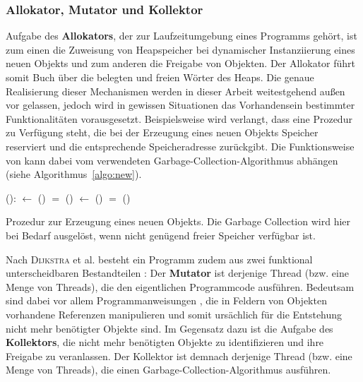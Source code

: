 \subsubsection*{Allokator, Mutator und Kollektor}
Aufgabe des \textbf{Allokators}, der zur Laufzeitumgebung eines Programms gehört, ist zum einen die Zuweisung von Heapspeicher bei dynamischer Instanziierung eines neuen Objekts und zum anderen die Freigabe von Objekten.
Der Allokator führt somit Buch über die belegten und freien Wörter des Heaps.
Die genaue Realisierung dieser Mechanismen werden in dieser Arbeit weitestgehend außen vor gelassen, jedoch wird in gewissen Situationen das Vorhandensein bestimmter Funktionalitäten vorausgesetzt.
Beispielsweise wird verlangt, dass eine Prozedur  zu Verfügung steht, die bei der Erzeugung eines neuen Objekts Speicher reserviert und die entsprechende Speicheradresse zurückgibt.
Die Funktionsweise von  kann dabei vom verwendeten Garbage-Collection-Algorithmus abhängen (siehe Algorithmus~\ref{algo:new}).

\begin{algorithm}
\begin{algorithmic}[1]
	\State {}():
	\State \quad {} $\gets$ ()		
	\State \quad \IF {} $=$ \Null		{}
	\State \quad \quad {}()	
	\State \quad \quad {} $\gets$ ()	
	\State \quad \quad \IF {} $=$ \Null
	\State \quad \quad \quad {}()
	\State \quad \Return {}
\end{algorithmic}
\caption[Prozedur  zur Erzeugung eines neuen Objekts]{Prozedur  zur Erzeugung eines neuen Objekts. Die Garbage Collection wird hier bei Bedarf ausgelöst, wenn nicht genügend freier Speicher verfügbar ist.}
\label{algo:new}
\end{algorithm}

Nach \textsc{Dijkstra} et al. besteht ein Programm zudem aus zwei funktional unterscheidbaren Bestandteilen \cite[S. 967]{dijkstra1978}:
Der \textbf{Mutator} ist derjenige Thread (bzw. eine Menge von Threads), die den eigentlichen Programmcode ausführen.
Bedeutsam sind dabei vor allem Programmanweisungen , die in Feldern von Objekten vorhandene Referenzen manipulieren und somit ursächlich für die Entstehung nicht mehr benötigter Objekte sind.
Im Gegensatz dazu ist die Aufgabe des \textbf{Kollektors}, die nicht mehr benötigten Objekte zu identifizieren und ihre Freigabe zu veranlassen.
Der Kollektor ist demnach derjenige Thread (bzw. eine Menge von Threads), die einen Garbage-Collection-Algorithmus ausführen.


